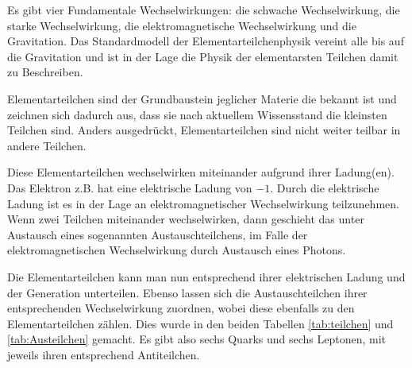 Es gibt vier Fundamentale Wechselwirkungen: die schwache Wechselwirkung, die starke Wechselwirkung, die elektromagnetische Wechselwirkung und die Gravitation. Das Standardmodell der Elementarteilchenphysik vereint alle bis auf die Gravitation und ist in der Lage die Physik der elementarsten Teilchen damit zu Beschreiben.

Elementarteilchen sind der Grundbaustein jeglicher Materie die bekannt ist und zeichnen sich dadurch aus, dass sie nach aktuellem Wissensstand die kleinsten Teilchen sind. Anders ausgedrückt, Elementarteilchen sind nicht weiter teilbar in andere Teilchen.

Diese Elementarteilchen wechselwirken miteinander aufgrund ihrer Ladung(en). Das Elektron z.B. hat eine elektrische Ladung von $-1$. Durch die elektrische Ladung ist es in der Lage an elektromagnetischer Wechselwirkung teilzunehmen. Wenn zwei Teilchen miteinander wechselwirken, dann geschieht das unter Austausch eines sogenannten Austauschteilchens, im Falle der elektromagnetischen Wechselwirkung durch Austausch eines Photons.

Die Elementarteilchen kann man nun entsprechend ihrer elektrischen Ladung und der Generation unterteilen. Ebenso lassen sich die Austauschteilchen ihrer entsprechenden Wechselwirkung zuordnen, wobei diese ebenfalls zu den Elementarteilchen z{\"a}hlen. Dies wurde in den beiden Tabellen \ref{tab:teilchen} und \ref{tab:Austeilchen} gemacht. Es gibt also sechs Quarks und sechs Leptonen, mit jeweils ihren entsprechend Antiteilchen.

